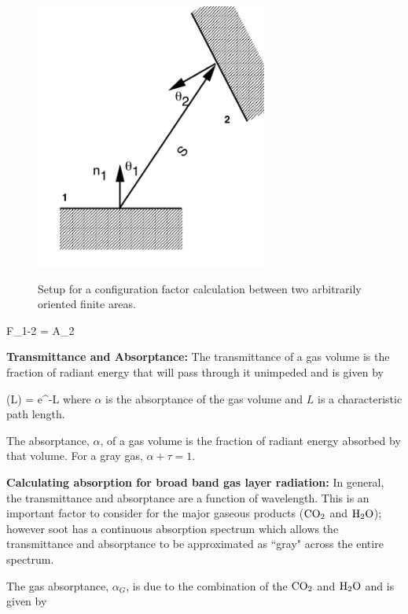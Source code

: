 \begin{figure}
\begin{center}
\includegraphics[width=3.0in]{FIGURES/Theory/Radiation_Config_Factor}\\
\end{center}
\caption{Setup for a configuration factor calculation between two arbitrarily oriented finite areas.}
 \label{fig:Rad_Config_Factor}
\end{figure}

\be F_{1-2} =  A_2 \ee

{\bf Transmittance and Absorptance:} The transmittance of a gas volume is the fraction of radiant energy that will pass through it unimpeded and is given by

\be \tau (L) = e^{-\alpha L} \ee
where $\alpha$ is the absorptance of the gas volume and $L$ is a characteristic path length.

The absorptance, $\alpha$, of a gas volume is the fraction of radiant energy absorbed by that volume.  For a gray gas, $\alpha + \tau = 1$.

{\bf Calculating absorption for broad band gas layer radiation:}  In general, the transmittance and absorptance are a function of wavelength.   This is an important factor to consider for the major gaseous products ($\textnormal{CO}_2$  and $\textnormal{H}_2 \textnormal{O}$); however soot has a continuous absorption spectrum which allows the transmittance and absorptance to be approximated as ``gray" \cite{SiegelandHowell:1981} across the entire spectrum.

The gas absorptance, $\alpha_G$, is due to the combination of the $\textnormal{CO}_2$  and $\textnormal{H}_2 \textnormal{O}$ and is given by

